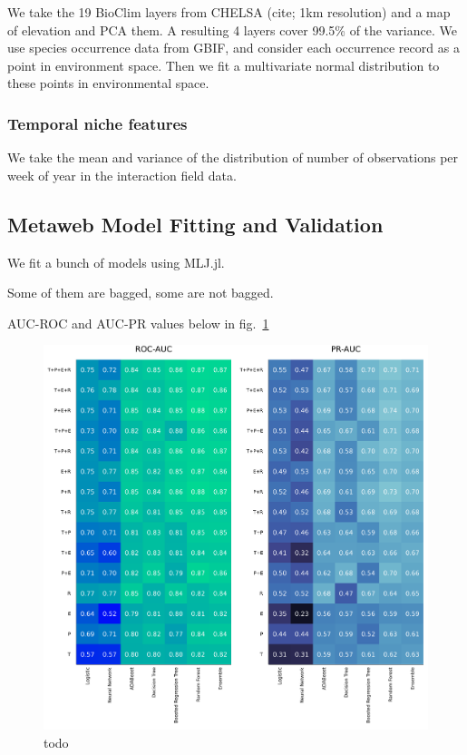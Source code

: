 \documentclass[11pt]{article}
\makeatletter
\def\maxwidth{\ifdim\Gin@nat@width>\linewidth\linewidth
\else\Gin@nat@width\fi}
\let\Oldincludegraphics\includegraphics
\renewcommand{\includegraphics}[1]{\Oldincludegraphics[width=\maxwidth]{#1}}
\makeatother
\begin{document}
We take the 19 BioClim layers from CHELSA (cite; 1km resolution) and a
map of elevation and PCA them. A resulting 4 layers cover 99.5\% of the
variance. We use species occurrence data from GBIF, and consider each
occurrence record as a point in environment space. Then we fit a
multivariate normal distribution to these points in environmental space.

\hypertarget{temporal-niche-features}{%
\subsubsection{Temporal niche features}\label{temporal-niche-features}}

We take the mean and variance of the distribution of number of
observations per week of year in the interaction field data.

\hypertarget{metaweb-model-fitting-and-validation}{%
\subsection{Metaweb Model Fitting and
Validation}\label{metaweb-model-fitting-and-validation}}

We fit a bunch of models using MLJ.jl.

Some of them are bagged, some are not bagged.

AUC-ROC and AUC-PR values below in fig.~\ref{fig:prroc}

\begin{figure}
\hypertarget{fig:prroc}{%
\centering
\includegraphics{./figures/PR_ROC.png}
\caption{todo}\label{fig:prroc}
}
\end{figure}
\end{document}
